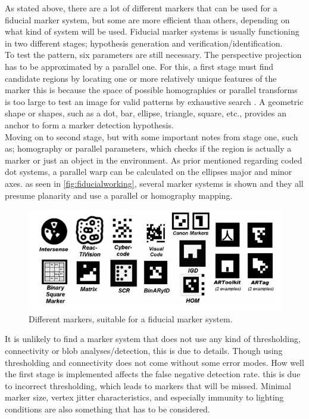 			
			As stated above, there are a lot of different markers that can be used for a fiducial marker system, but some are more efficient than others, depending on what kind of system will be used.
			Fiducial marker systems is usually functioning in two different stages; hypothesis generation and verification/identification.\\
			
			To test the pattern, six parameters are still necessary. The perspective projection has to be approximated by a parallel one. For this, a first stage must find candidate regions by locating one or more relatively unique features of the marker this is because the space of possible homographies or parallel transforms is too large to test an image for valid patterns by exhaustive search \cite{fiducialMarkers}.
			A geometric shape or shapes, such as a dot, bar, ellipse, triangle, square, etc., provides an anchor to form a marker detection hypothesis.\\
			
			Moving on to second stage, but with some important notes from stage one, such as; homography or parallel parameters, which checks if the region is actually a marker or just an object in the environment. As prior mentioned regarding coded dot systems, a parallel warp can be calculated on the ellipses major and minor axes.
			as seen in \autoref{fig:fiducialworking}, several marker systems is shown and they all presume planarity and use a parallel or homography mapping.
			
			\begin{figure}[H]
				\centering
				\includegraphics[width=0.9\linewidth]{figure/Analysis/fiducialworking.png}
				\caption{Different markers, suitable for a fiducial marker system.}
				\label{fig:fiducialworking}
			\end{figure}
			
			It is unlikely to find a marker system that does not use any kind of thresholding, connectivity or blob analyses/detection, this is due to details. Though using thresholding and connectivity does not come without some error modes. How well the first stage is implemented affects the false negative detection rate. this is due to incorrect thresholding, which leads to markers that will be missed. Minimal marker size, vertex jitter characteristics, and especially immunity to
			lighting conditions\cite{fidOcclusion} are also something that has to be considered.\\
			
